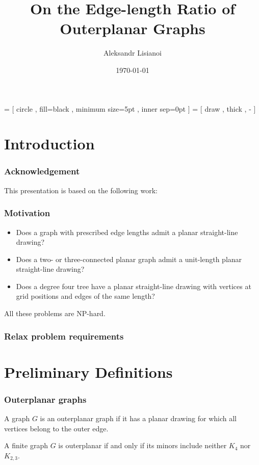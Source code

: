 \documentclass[xetex,mathserif,serif]{beamer}
\title{On the Edge-length Ratio of Outerplanar Graphs}
\author{Aleksandr Lisianoi}
\institute{Technische Universität Wien}
\date{\today}
\begin{document}
 = [
  circle
  , fill=black
  , minimum size=5pt
  , inner sep=0pt
]
 = [
  draw
  , thick
  , -
]


\maketitle

\section{Introduction}

\begin{frame}
  \frametitle{Acknowledgement}

  This presentation is based on the following work:

\end{frame}

\begin{frame}
  \frametitle{Motivation}

  \begin{itemize}
  \item Does a graph with prescribed edge lengths admit a planar straight-line drawing?
  \item Does a two- or three-connected planar graph admit a unit-length planar straight-line drawing?
  \item Does a degree four tree have a planar straight-line drawing with vertices at grid positions and edges of the same length?
  \end{itemize}

  \begin{center}
    All these problems are NP-hard.
    \end{center}

\end{frame}

\begin{frame}
  \frametitle{Relax problem requirements}
\end{frame}

\section{Preliminary Definitions}

\begin{frame}
  \frametitle{Outerplanar graphs}

    \begin{definition}
    A graph \(G\) is an outerplanar graph if it has a planar drawing for which all vertices belong to the outer edge.
  \end{definition}

  \begin{definition}
    A finite graph \(G\) is outerplanar if and only if its minors include neither \(K_4\) nor \(K_{2, 3}\).
  \end{definition}
\end{frame}
\end{document}
